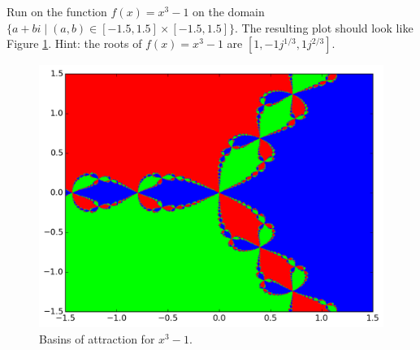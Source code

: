 \begin{problem}

Run  on the function $f(x) = x^3-1$ on the domain $\{a+bi \mid (a, b) \in [-1.5, 1.5] \times [-1.5, 1.5] \}$. 
The resulting plot should look like Figure \ref{fig:fractal_hw}.  Hint: the roots of $f(x) = x^3-1$ are $[1,-1j^{1/3},1j^{2/3}]$.


\begin{figure}[H]
\begin{center}
\includegraphics[scale=0.66]{fractal_hw}
\caption{Basins of attraction for $x^3-1$.}
\label{fig:fractal_hw}
\end{center}
\end{figure}
\end{problem}

